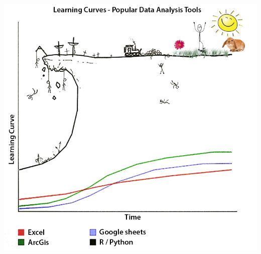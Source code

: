 \documentclass{beamer}
\begin{document}
  \begin{frame}
	\centering
	\includegraphics[scale=0.25]{learning_curve2.png} \\
  \end{frame}

  
\end{document}
